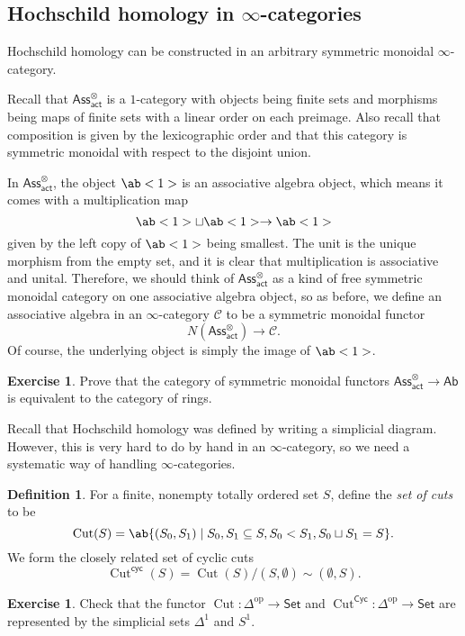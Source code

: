 \documentclass[10pt, oneside]{memoir}
\theoremstyle{definition}
\newtheorem{defn}[thm]{Definition}
\newtheorem{exer}[thm]{Exercise}
\theoremstyle{remark}
\theoremstyle{plain}
\theoremstyle{definition}
\theoremstyle{remark}
\newcommand{\mc}[1]{\mathcal{#1}}
\newcommand{\on}[1]{\operatorname{#1}}
\newcommand{\ms}[1]{\mathsf{#1}}
\newcommand{\1}{\mathbf{1}}
\newcommand{\2}{\mathbf{2}}
\newcommand{\3}{\mathbf{3}}
\DeclareMathOperator{\op}{op}
\begin{document}
\subsection{\texorpdfstring{Hochschild homology in $\infty$-categories}{Hochschild homology in infinity-categories}}%

Hochschild homology can be constructed in an arbitrary symmetric monoidal $\infty$-category.

Recall that $\ms{Ass}^{\otimes}_{\ms{act}}$ is a $1$-category with objects being finite sets and morphisms being maps of finite sets with a linear order on each preimage. Also recall that composition is given by the lexicographic order and that this category is symmetric monoidal with respect to the disjoint union.

In $\ms{Ass}_{\ms{act}}^{\otimes}$, the object $\ab<1>$ is an associative algebra object, which means it comes with a multiplication map
\[ \ab<1> \sqcup \ab<1> \to \ab<1> \]
given by the left copy of $\ab<1>$ being smallest. The unit is the unique morphism from the empty set, and it is clear that multiplication is associative and unital. Therefore, we should think of $\ms{Ass}_{\ms{act}}^{\otimes}$ as a kind of free symmetric monoidal category on one associative algebra object, so as before, we define an associative algebra in an $\infty$-category $\mc{C}$ to be a symmetric monoidal functor
\[ N(\ms{Ass}_{\ms{act}}^{\otimes}) \to \mc{C}. \]
Of course, the underlying object is simply the image of $\ab<1>$.

\begin{exer}
    Prove that the category of symmetric monoidal functors $\ms{Ass}_{\ms{act}}^{\otimes} \to \ms{Ab}$ is equivalent to the category of rings.
\end{exer}

Recall that Hochschild homology was defined by writing a simplicial diagram. However, this is very hard to do by hand in an $\infty$-category, so we need a systematic way of handling $\infty$-categories.

\begin{defn}
    For a finite, nonempty totally ordered set $S$, define the \textit{set of cuts} to be
    \[ \on{Cut}(S) = \ab\{ (S_0, S_1) \mid S_0, S_1 \subseteq S, S_0 < S_1, S_0 \sqcup S_1 = S \}. \]
    We form the closely related set of cyclic cuts
    \[ \on{Cut}^{\ms{cyc}}(S) = \on{Cut}(S) / (S, \emptyset) \sim (\emptyset, S). \]
\end{defn}

\begin{exer}
    Check that the functor $\on{Cut} \colon \Delta^{\op} \to \ms{Set}$ and $\on{Cut}^{\ms{Cyc}} \colon \Delta^{\op} \to \ms{Set}$ are represented by the simplicial sets $\Delta^1$ and $S^1$.
\end{exer}
\end{document}
